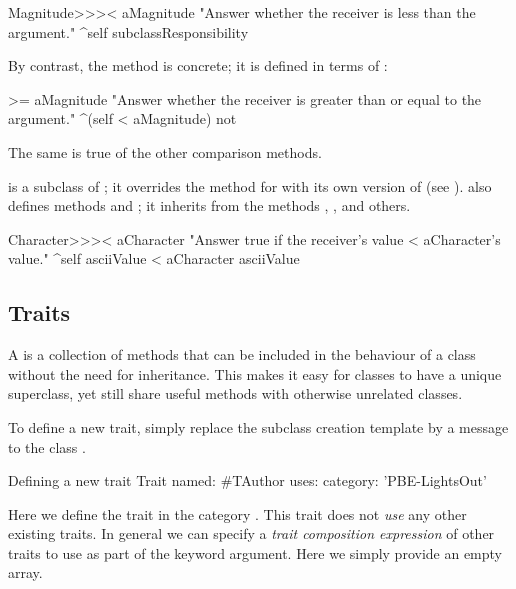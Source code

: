 \documentclass[a4paper,10pt,twoside]{book}
\begin{document}
\begin{method}[MagnitudeLessThan]{}
Magnitude>>>< aMagnitude 
	"Answer whether the receiver is less than the argument."
	^self subclassResponsibility
\end{method}

\noindent
By contrast, the method  is concrete; it is defined in terms of \ct{<}:

\begin{method}[Magnitude>=]{}
>= aMagnitude 
	"Answer whether the receiver is greater than or equal to the argument."
	^(self < aMagnitude) not
\end{method}
The same is true of the other comparison methods.

 is a subclass of ; it overrides the  method for \ct{<} with its own version of \ct{<} (see ).   also defines methods \ct{=} and ; it inherits from  the methods \ct{>=}, \ct{<=}, \ct{~=} and others.

\begin{method}[CharacterLessThan]{}
Character>>>< aCharacter 
	"Answer true if the receiver's value < aCharacter's value."
	^self asciiValue < aCharacter asciiValue
\end{method}

\subsection{Traits}
A  is a collection of methods that can be included in the behaviour of a class without the need for inheritance.
This makes it easy for classes to have a unique superclass, yet still share useful methods with otherwise unrelated classes.

To define a new trait, simply replace the subclass creation template by a message to the class .

\begin{classdef}[tauthor]{Defining a new trait}
Trait named: #TAuthor
	uses: { }
	category: 'PBE-LightsOut'
\end{classdef}

\noindent
Here we define the trait  in the category .
This trait does not \emph{use} any other existing traits.
In general we can specify a \emph{trait composition expression} of other traits to use as part of the  keyword argument.
Here we simply provide an empty array.
\end{document}
